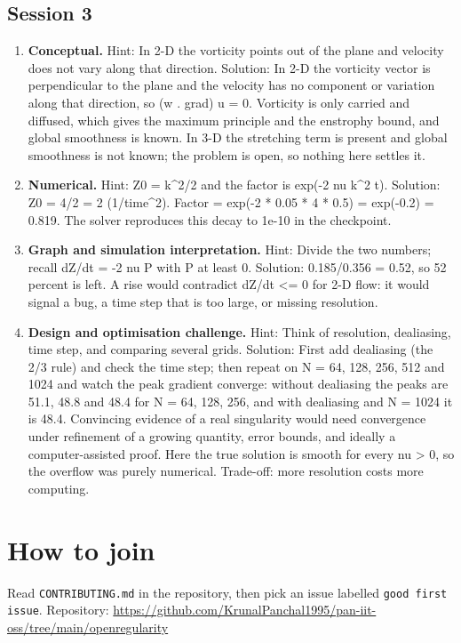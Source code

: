 \documentclass[11pt,a4paper]{article}
\begin{document}
\subsection*{Session 3}
\begin{enumerate}[nosep]
\item \textbf{Conceptual.} Hint: In 2-D the vorticity points out of the plane and velocity does not vary along that direction. Solution: In 2-D the vorticity vector is perpendicular to the plane and the velocity has no component or variation along that direction, so (w . grad) u = 0. Vorticity is only carried and diffused, which gives the maximum principle and the enstrophy bound, and global smoothness is known. In 3-D the stretching term is present and global smoothness is not known; the problem is open, so nothing here settles it.
\item \textbf{Numerical.} Hint: Z0 = k\textasciicircum{}2/2 and the factor is exp(-2 nu k\textasciicircum{}2 t). Solution: Z0 = 4/2 = 2 (1/time\textasciicircum{}2). Factor = exp(-2 * 0.05 * 4 * 0.5) = exp(-0.2) = 0.819. The solver reproduces this decay to 1e-10 in the checkpoint.
\item \textbf{Graph and simulation interpretation.} Hint: Divide the two numbers; recall dZ/dt = -2 nu P with P at least 0. Solution: 0.185/0.356 = 0.52, so 52 percent is left. A rise would contradict dZ/dt \textless{}= 0 for 2-D flow: it would signal a bug, a time step that is too large, or missing resolution.
\item \textbf{Design and optimisation challenge.} Hint: Think of resolution, dealiasing, time step, and comparing several grids. Solution: First add dealiasing (the 2/3 rule) and check the time step; then repeat on N = 64, 128, 256, 512 and 1024 and watch the peak gradient converge: without dealiasing the peaks are 51.1, 48.8 and 48.4 for N = 64, 128, 256, and with dealiasing and N = 1024 it is 48.4. Convincing evidence of a real singularity would need convergence under refinement of a growing quantity, error bounds, and ideally a computer-assisted proof. Here the true solution is smooth for every nu \textgreater{} 0, so the overflow was purely numerical. Trade-off: more resolution costs more computing.
\end{enumerate}

\section{How to join}
Read \texttt{CONTRIBUTING.md} in the repository, then pick an issue labelled \texttt{good first issue}. Repository: \url{https://github.com/KrunalPanchal1995/pan-iit-oss/tree/main/openregularity}
\end{document}
